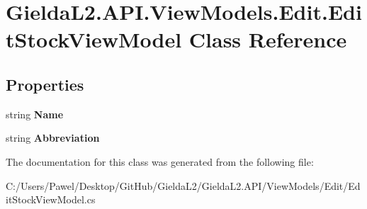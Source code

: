 \hypertarget{class_gielda_l2_1_1_a_p_i_1_1_view_models_1_1_edit_1_1_edit_stock_view_model}{}\section{Gielda\+L2.\+A\+P\+I.\+View\+Models.\+Edit.\+Edit\+Stock\+View\+Model Class Reference}
\label{class_gielda_l2_1_1_a_p_i_1_1_view_models_1_1_edit_1_1_edit_stock_view_model}
\subsection*{Properties}
\begin{DoxyCompactItemize}
\item 
\mbox{\label{class_gielda_l2_1_1_a_p_i_1_1_view_models_1_1_edit_1_1_edit_stock_view_model_a7427909aed1f7b1ecc88a6af91bab2e5}} 
string {\bfseries Name}
\item 
\mbox{\label{class_gielda_l2_1_1_a_p_i_1_1_view_models_1_1_edit_1_1_edit_stock_view_model_a8a462faa2793630042d6aa45c1e4f224}} 
string {\bfseries Abbreviation}
\end{DoxyCompactItemize}


The documentation for this class was generated from the following file\+:\begin{DoxyCompactItemize}
\item 
C\+:/\+Users/\+Pawel/\+Desktop/\+Git\+Hub/\+Gielda\+L2/\+Gielda\+L2.\+A\+P\+I/\+View\+Models/\+Edit/Edit\+Stock\+View\+Model.\+cs\end{DoxyCompactItemize}

